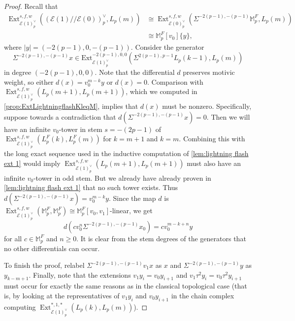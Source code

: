 \documentclass[10pt,a4paper]{amsart}
\DeclareMathOperator{\Ext}{Ext}
\newcommand{\cE}{{\mathcal E}}
\newcommand{\mM}{{\mathbb M}}
\begin{document}
\begin{proof}
Recall that 
\begin{align*}
    {\Ext}^{s,f,w}_{\mathcal{E}(1)^\vee_p}((\mathcal{E}(1)//\mathcal{E}(0))_p^\vee, L_p(m)) & \cong {\Ext}^{s,f,w}_{\mathcal{E}(0)^\vee_p}(\Sigma^{-2(p-1), -(p-1)}\mM_p^F, L_p(m)) \\
    & \cong \mM_p^F[v_0]\{y\},
\end{align*} where $|y| = (-2(p-1),0, -(p-1))$. Consider the generator 
\[
\Sigma^{-2(p-1), -(p-1)}x \in \text{Ext}^{-2(p-1),0,0}_{\mathcal{E}(1)^\vee_p}(\Sigma^{2(p-1), p-1}L_p(k-1), L_p(m))
\]
in degree $(-2(p-1),0,0)$. Note that the differential $d$ preserves motivic weight, so either $d(x) = v_0^{m-k }y$ or $d(x) = 0$. Comparison with  $\Ext^{s,f,w}_{\cE(1)_p^\vee} \left(L_p (m+1), L_p (m+1)\right)$, which we computed in \cref{prop:ExtLightningflashKleqM}, implies that $d(x)$ must be nonzero. Specifically, suppose towards a contradiction that $d(\Sigma^{-2(p-1), -(p-1)}x) = 0$. Then we will have an infinite $v_{0}$-tower in stem $s=-(2p-1)$ of $\Ext^{s,f,w}_{\mathcal{E}(1)^\vee_p}\left(L_p^F(k), L_p^F(m)\right)$ for $k=m+1$ and $k=m$. Combining this with the long exact sequence used in the inductive computation of \cref{lem:lightning flash ext 1} would imply $\Ext^{s,f,w}_{\mathcal{E}(1)^\vee_p}\left(L_p(m+1), L_p(m+1)\right)$ must also have an infinite $v_{0}$-tower in odd stem. But we already have already proven in \cref{lem:lightning flash ext 1} that no such tower exists. Thus $d(\Sigma^{-2(p-1), -(p-1)}x) = v_0^{m-k}y$. Since  the map $d$ is $\Ext^{s,f,w}_{\mathcal{E}(1)^\vee_p}\left(\mM_p^F, \mM_p^F\right) \cong \mM_{p}^{F}[v_{0},v_{1}]$-linear, we get 
\[
d(cv_{0}^{n}\Sigma^{-2(p-1), -(p-1)}x_0 ) = cv_{0}^{m - k + n}y
\]
for all $c \in \mM_{p}^{F}$ and $n \ge 0$. It is clear from the stem degrees of the generators that no other differentials can occur. 

To finish the proof, relabel $\Sigma^{-2(p-1), -(p-1)}v_1x$ as $x$ and $\Sigma^{-2(p-1), -(p-1)}y$ as $y_{k-m+1}$. Finally, note that the extensions $v_{1}y_{i} = v_{0}y_{i+1}$ and $v_{1}\tau^{2}y_{i} = v_{0}\tau^{2}y_{i+1}$ must occur for exactly the same reasons as in the classical topological case (that is, by looking at the representatives of $v_1y_i$ and $v_0y_{i+1}$ in the chain complex computing $\Ext_{\cE(1)_p^\vee}^{*,1,*}\left(L_p(k),L_p(m)\right)$).
\end{proof}
\end{document}
